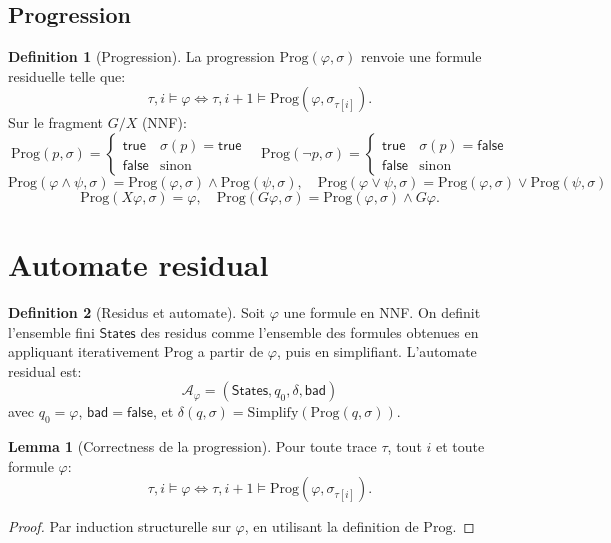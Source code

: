 \documentclass[11pt]{article}
\newcommand{\eval}{\models}
\newcommand{\Prog}{\mathrm{Prog}}
\newcommand{\bad}{\mathsf{bad}}
\newcommand{\states}{\mathsf{States}}
\newcommand{\deltaa}{\delta}
\theoremstyle{definition}
\newtheorem{definition}{Definition}
\newtheorem{lemma}{Lemma}
\begin{document}
\subsection{Progression}

\begin{definition}[Progression]
La progression $\Prog(\varphi,\sigma)$ renvoie une formule residuelle telle que:
\[
\tau,i \eval \varphi \iff \tau,i+1 \eval \Prog(\varphi,\sigma_{\tau[i]}).
\]
Sur le fragment $G/X$ (NNF):
\[
\Prog(p,\sigma)=\begin{cases}\mathsf{true} & \sigma(p)=\mathsf{true}\\ \mathsf{false} & \text{sinon}\end{cases}
\quad
\Prog(\neg p,\sigma)=\begin{cases}\mathsf{true} & \sigma(p)=\mathsf{false}\\ \mathsf{false} & \text{sinon}\end{cases}
\]
\[
\Prog(\varphi\wedge\psi,\sigma)=\Prog(\varphi,\sigma)\wedge\Prog(\psi,\sigma),\quad
\Prog(\varphi\vee\psi,\sigma)=\Prog(\varphi,\sigma)\vee\Prog(\psi,\sigma)
\]
\[
\Prog(X\varphi,\sigma)=\varphi,\quad
\Prog(G\varphi,\sigma)=\Prog(\varphi,\sigma)\wedge G\varphi.
\]
\end{definition}

\section{Automate residual}

\begin{definition}[Residus et automate]
Soit $\varphi$ une formule en NNF. On definit l'ensemble fini $\states$ des residus
comme l'ensemble des formules obtenues en appliquant iterativement $\Prog$
a partir de $\varphi$, puis en simplifiant. L'automate residual est:
\[
\mathcal{A}_\varphi = (\states, q_0, \deltaa, \bad)
\]
avec $q_0 = \varphi$, $\bad = \mathsf{false}$, et
$\deltaa(q,\sigma)=\mathrm{Simplify}(\Prog(q,\sigma))$.
\end{definition}

\begin{lemma}[Correctness de la progression]
Pour toute trace $\tau$, tout $i$ et toute formule $\varphi$:
\[
\tau,i \eval \varphi \iff \tau,i+1 \eval \Prog(\varphi,\sigma_{\tau[i]}).
\]
\end{lemma}
\begin{proof}
Par induction structurelle sur $\varphi$, en utilisant la definition de $\Prog$.
\end{proof}
\end{document}

